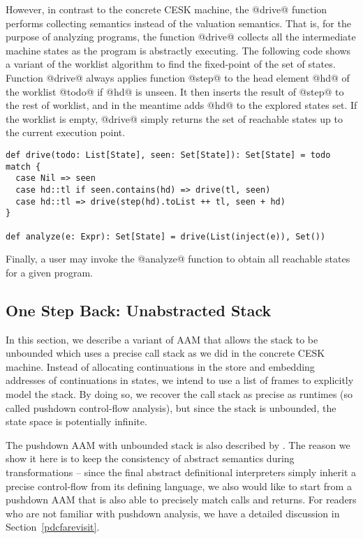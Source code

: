 \documentclass[acmsmall]{acmart}\settopmatter{}
\begin{document}
However, in contrast to the concrete CESK machine, the @drive@ function performs 
collecting semantics instead of the valuation semantics. That is, for the purpose of
analyzing programs, the function @drive@ collects all the intermediate machine states 
as the program is abstractly executing. The following code shows a variant of the 
worklist algorithm to find the fixed-point of the set of states.
Function @drive@ always applies function @step@ to the head element @hd@ of
the worklist @todo@ if @hd@ is unseen. It then inserts the result of @step@ to
the rest of worklist, and in the meantime adds @hd@ to the explored states set.
If the worklist is empty, @drive@ simply returns the set of reachable states
up to the current execution point.

\begin{lstlisting}
def drive(todo: List[State], seen: Set[State]): Set[State] = todo match {
  case Nil => seen
  case hd::tl if seen.contains(hd) => drive(tl, seen)
  case hd::tl => drive(step(hd).toList ++ tl, seen + hd)
}

def analyze(e: Expr): Set[State] = drive(List(inject(e)), Set())
\end{lstlisting}

Finally, a user may invoke the @analyze@ function to obtain all reachable states for 
a given program.


\subsection{One Step Back: Unabstracted Stack} \label{unabs}

In this section, we describe a variant of AAM that allows the stack to be
unbounded which uses a precise call stack as we did in the concrete CESK machine.
Instead of allocating continuations in the store and embedding addresses of 
continuations in states, we intend to use a list of frames to explicitly model 
the stack. By doing so, we recover the call stack as precise as runtimes
(so called pushdown control-flow analysis), but since the stack is unbounded, 
the state space is potentially infinite. 

The pushdown AAM with unbounded stack is also described by \citeauthor{van2012systematic} 
\cite{van2012systematic}. 
The reason we show it here is to keep the consistency of abstract semantics during 
transformations -- since the final abstract definitional interpreters simply inherit
a precise control-flow from its defining language, we also would like to start from a
pushdown AAM that is also able to precisely match calls and returns.
For readers who are not familiar with pushdown analysis, we have a detailed discussion 
in Section~\ref{pdcfarevisit}.
\end{document}
